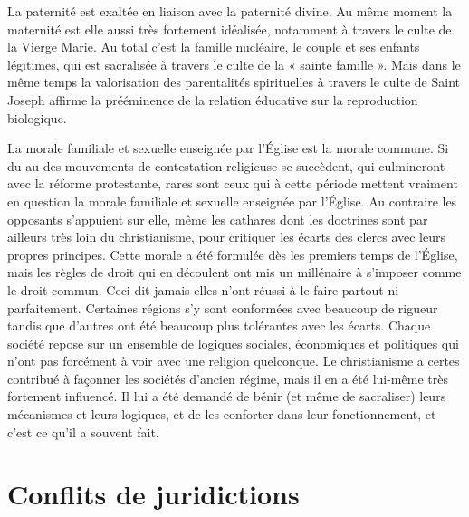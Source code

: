  La paternité est exaltée en liaison avec la paternité divine. Au même moment la maternité est elle aussi très fortement idéalisée, notamment à travers le culte de la Vierge Marie. Au total c'est la famille nucléaire, le couple et ses enfants légitimes, qui est sacralisée à travers le culte de la « sainte famille ». Mais dans le même temps la valorisation des parentalités spirituelles à travers le culte de Saint Joseph affirme la prééminence de la relation éducative sur la reproduction biologique.

 La morale familiale et sexuelle enseignée par l'Église est la morale commune. Si du  au  des mouvements de contestation religieuse se succèdent, qui culmineront avec la réforme protestante, rares sont ceux qui à cette période mettent vraiment en question la morale familiale et sexuelle enseignée par l'Église. Au contraire les opposants s'appuient sur elle, même les cathares dont les doctrines sont par ailleurs très loin du christianisme, pour critiquer les écarts des clercs avec leurs propres principes. Cette morale a été formulée dès les premiers temps de l'Église, mais les règles de droit qui en découlent ont mis un millénaire à s'imposer comme le droit commun. Ceci dit jamais elles n'ont réussi à le faire partout ni parfaitement. Certaines régions s'y sont conformées avec beaucoup de rigueur tandis que d'autres ont été beaucoup plus tolérantes avec les écarts. Chaque société repose sur un ensemble de logiques sociales, économiques et politiques qui n'ont pas forcément à voir avec une religion quelconque. Le christianisme a certes contribué à façonner les sociétés d'ancien régime, mais il en a été lui-même très fortement influencé. Il lui a été demandé de bénir (et même de sacraliser) leurs mécanismes et leurs logiques, et de les conforter dans leur fonctionnement, et c'est ce qu'il a souvent fait. 

\section{Conflits de juridictions}

